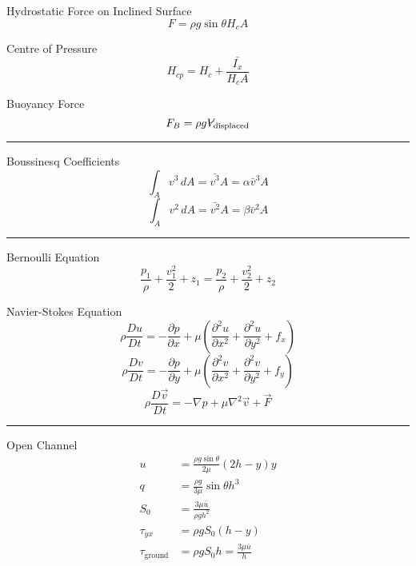 \documentclass[twoside]{article}
\makeatletter
\DeclareRobustCommand{\vol}{\text{\volumedash}V}
\newcommand{\volumedash}{%
	\makebox[0pt][l]{%
		\ooalign{\hfil\hphantom{$\m@th V$}\hfil\cr\kern0.16em\rotatebox{27.5}{\textbf{--}}\hfil\cr}%
	}%
}
\numberwithin{equation}{section}
\makeatother
\begin{document}
	Hydrostatic Force on Inclined Surface
	\begin{equation*}
		F = \rho g \sin \theta H_c A
	\end{equation*}
	
	Centre of Pressure
	\begin{equation*}
		H_{cp} = H_c+\frac{\bar{I_x}}{H_c A}
	\end{equation*}
	
	Buoyancy Force
	\begin{equation*}
		F_B = \rho g \vol_{\text{displaced}}
	\end{equation*}
	
	\noindent\rule{\textwidth}{0.5pt}
	
	Boussinesq Coefficients
	\begin{equation*}
		\int_A v^3 \, dA = \bar{v^3} A = \alpha \bar{v}^3 A
	\end{equation*}
	\begin{equation*}
		\int_A v^2 \, dA = \bar{v^2} A = \beta \bar{v}^2 A
	\end{equation*}
	
	\noindent\rule{\textwidth}{0.5pt}
	
	Bernoulli Equation
	\begin{equation*}
		\frac{p_1}{\rho}+\frac{v_1^2}{2}+z_1 = \frac{p_2}{\rho}+\frac{v_2^2}{2}+z_2
	\end{equation*}
	
	Navier-Stokes Equation
	\begin{equation*}
		\rho \frac{Du}{Dt} = -\frac{\partial p}{\partial x}+\mu \left( \frac{\partial^2 u}{\partial x^2}+\frac{\partial^2 u}{\partial y^2}+f_x \right)
	\end{equation*}
	\begin{equation*}
		\rho \frac{Dv}{Dt} = -\frac{\partial p}{\partial y}+\mu \left( \frac{\partial^2 v}{\partial x^2}+\frac{\partial^2 v}{\partial y^2}+f_y \right)
	\end{equation*}
	\begin{equation*}
		\rho \frac{D\vec{v}}{Dt} = -\nabla p+\mu \nabla^2 \vec{v}+\vec{F}
	\end{equation*}
	
	\noindent\rule{\textwidth}{0.5pt}
	
	Open Channel
	\begin{align*}
		u &= \frac{\rho g \sin \theta}{2\mu} (2h-y)y \\
		q &= \frac{\rho g}{3\mu} \sin \theta h^3 \\
		S_0 &= \frac{3\mu \bar{u}}{\rho gh^2} \\
		\tau_{yx} &= \rho gS_0(h-y) \\
		\tau_{\text{ground}} &= \rho gS_0 h = \frac{3\mu \bar{u}}{h}
	\end{align*}
	
\end{document}
